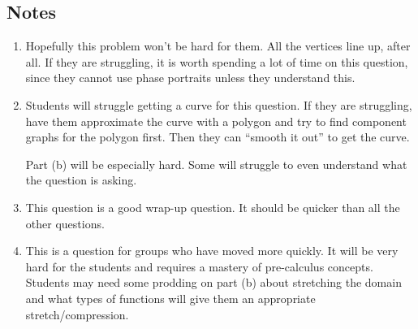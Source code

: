 	
\subsection*{Notes}
	\begin{enumerate}
		\item Hopefully this problem won't be hard for them. All the vertices line up, after all. If they are struggling,
		it is worth spending a lot of time on this question, since they cannot use phase portraits unless they understand this.

		\item Students will struggle getting a curve for this question. If they are struggling, have them approximate
		the curve with a polygon and try to find component graphs for the polygon first. Then they can ``smooth it out''
		to get the curve.
		
		Part (b) will be especially hard. Some will struggle to even understand what the question is asking.

		\item This question is a good wrap-up question. It should be quicker than all the other questions.

		\item This is a question for groups who have moved more quickly. It will be very hard for the students and requires a
		mastery of pre-calculus concepts. Students may need some prodding on part (b) about stretching the domain and what
		types of functions will give them an appropriate stretch/compression.



	\end{enumerate}